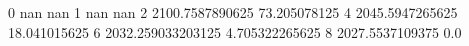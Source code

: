 0 nan nan
1 nan nan
2 2100.7587890625 73.205078125
4 2045.5947265625 18.041015625
6 2032.259033203125 4.705322265625
8 2027.5537109375 0.0
